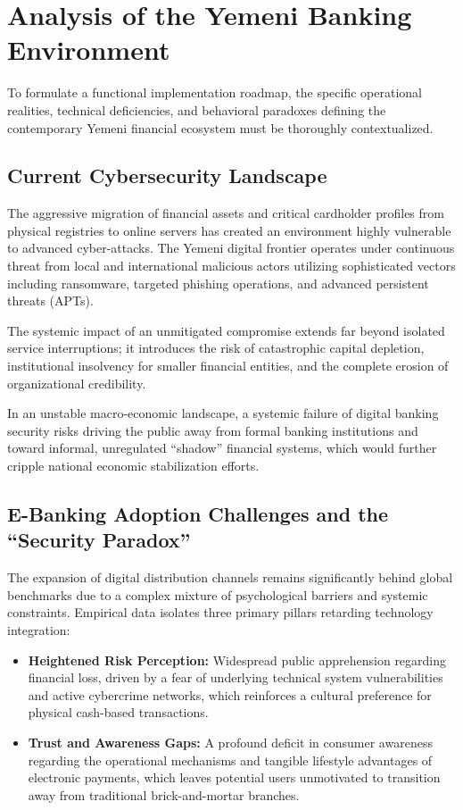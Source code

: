 \documentclass[12pt,a4paper,oneside]{report}
\begin{document}
	\section{Analysis of the Yemeni Banking Environment}
	To formulate a functional implementation roadmap, the specific operational realities, technical deficiencies, and behavioral paradoxes defining the contemporary Yemeni financial ecosystem must be thoroughly contextualized.
	
	\subsection{Current Cybersecurity Landscape}
	The aggressive migration of financial assets and critical cardholder profiles from physical registries to online servers has created an environment highly vulnerable to advanced cyber-attacks. The Yemeni digital frontier operates under continuous threat from local and international malicious actors utilizing sophisticated vectors including ransomware, targeted phishing operations, and advanced persistent threats (APTs). 
	
	The systemic impact of an unmitigated compromise extends far beyond isolated service interruptions; it introduces the risk of catastrophic capital depletion, institutional insolvency for smaller financial entities, and the complete erosion of organizational credibility. 
	
	In an unstable macro-economic landscape, a systemic failure of digital banking security risks driving the public away from formal banking institutions and toward informal, unregulated ``shadow'' financial systems, which would further cripple national economic stabilization efforts.
	
	\subsection{E-Banking Adoption Challenges and the ``Security Paradox''}
	The expansion of digital distribution channels remains significantly behind global benchmarks due to a complex mixture of psychological barriers and systemic constraints. Empirical data isolates three primary pillars retarding technology integration:
	\begin{itemize}
		\item \textbf{Heightened Risk Perception:} Widespread public apprehension regarding financial loss, driven by a fear of underlying technical system vulnerabilities and active cybercrime networks, which reinforces a cultural preference for physical cash-based transactions.
		\item \textbf{Trust and Awareness Gaps:} A profound deficit in consumer awareness regarding the operational mechanisms and tangible lifestyle advantages of electronic payments, which leaves potential users unmotivated to transition away from traditional brick-and-mortar branches.
	\end{itemize}
	
\end{document}
